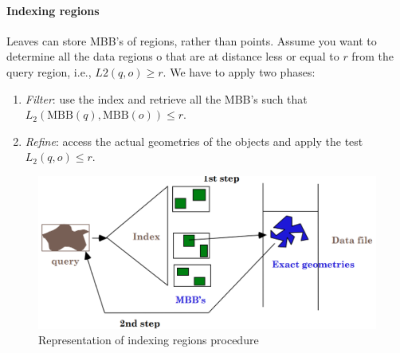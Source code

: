 \paragraph*{Indexing regions}
Leaves can store MBB's of regions, rather than points. 
Assume you want to determine all the data regions o that are at distance less or equal to $r$ from the query region, i.e., $L2(q,o) \geq r$. 
We have to apply two phases: 
\begin{enumerate}
    \item \textit{Filter}: use the index and retrieve all the MBB's such that $L_2\left(\text{MBB}(q),\text{MBB}(o)\right) \leq r$. 
    \item \textit{Refine}: access the actual geometries of the objects and apply the test $L_2(q,o) \leq r$. 
\end{enumerate}
\begin{figure}[H]
    \centering
    \includegraphics[width=0.5\linewidth]{images/i.png}
    \caption{Representation of indexing regions procedure}
\end{figure}